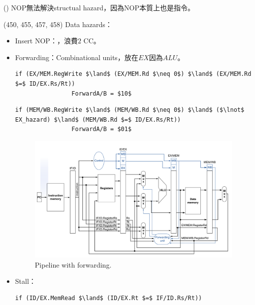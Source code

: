 \item \begin{theorem}{()} NOP無法解決structual hazard，因為NOP本質上也是指令。
\end{theorem}

\item \begin{theorem}{(450, 455, 457, 458)} Data hazards：\begin{itemize}
        \item Insert NOP：，浪費$2$ CC。
        \item Forwarding：Combinational units，放在$EX$因為$ALU$。
        \begin{lstlisting}[caption={EX hazard.}, captionpos=b, mathescape=true]
            if (EX/MEM.RegWrite $\land$ (EX/MEM.Rd $\neq 0$) $\land$ (EX/MEM.Rd $=$ ID/EX.Rs/Rt))
                ForwardA/B = $10$
        \end{lstlisting}
        \begin{lstlisting}[caption={MEM hazard.}, captionpos=b, mathescape=true]
            if (MEM/WB.RegWrite $\land$ (MEM/WB.Rd $\neq 0$) $\land$ ($\lnot$ EX_hazard) $\land$ (MEM/WB.Rd $=$ ID/EX.Rs/Rt))
                ForwardA/B = $01$
        \end{lstlisting}
        \begin{figure}[H]
            \centering
            \includegraphics[scale=0.3]{img/pipeline-forward.png}
            \caption{Pipeline with forwarding.}
            \label{img:pipeline-forward}
        \end{figure}
        \item Stall：\code{}
        \begin{lstlisting}[caption={Stall.}, captionpos=b, mathescape=true]
            if (ID/EX.MemRead $\land$ (ID/EX.Rt $=$ IF/ID.Rs/Rt))

\end{lstlisting}
\end{itemize}
\end{theorem}
